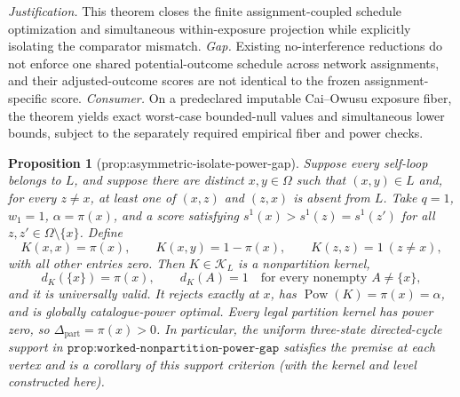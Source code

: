 \documentclass{article}
\newtheorem{proposition}{Proposition}
\begin{document}
\par\smallskip\noindent \textit{Justification.} This theorem closes the finite assignment-coupled schedule optimization and simultaneous within-exposure projection while explicitly isolating the comparator mismatch. \textit{Gap.} Existing no-interference reductions do not enforce one shared potential-outcome schedule across network assignments, and their adjusted-outcome scores are not identical to the frozen assignment-specific score. \textit{Consumer.} On a predeclared imputable Cai--Owusu exposure fiber, the theorem yields exact worst-case bounded-null values and simultaneous lower bounds, subject to the separately required empirical fiber and power checks.

\begin{proposition}[prop:asymmetric-isolate-power-gap]\label{prop:asymmetric-isolate-power-gap}
Suppose every self-loop belongs to \(L\), and suppose there are distinct \(x,y\in\Omega\) such that \((x,y)\in L\) and, for every \(z\neq x\), at least one of \((x,z)\) and \((z,x)\) is absent from \(L\).  Take \(q=1\), \(w_1=1\), \(\alpha=\pi(x)\), and a score satisfying \(s^1(x)>s^1(z)=s^1(z')\) for all \(z,z'\in\Omega\setminus\{x\}\).  Define
\[
 K(x,x)=\pi(x),\qquad K(x,y)=1-\pi(x),\qquad K(z,z)=1\ (z\neq x),
\]
with all other entries zero.  Then \(K\in\mathcal K_L\) is a nonpartition kernel,
\[
 d_K(\{x\})=\pi(x),
 \qquad
 d_K(A)=1\quad\text{for every nonempty }A\neq\{x\},
\]
and it is universally valid.  It rejects exactly at \(x\), has \(\operatorname{Pow}(K)=\pi(x)=\alpha\), and is globally catalogue-power optimal.  Every legal partition kernel has power zero, so \(\Delta_{\mathrm{part}}=\pi(x)>0\).  In particular, the uniform three-state directed-cycle support in \(\texttt{prop:worked-nonpartition-power-gap}\) satisfies the premise at each vertex and is a corollary of this support criterion (with the kernel and level constructed here).
\end{proposition}
\end{document}
